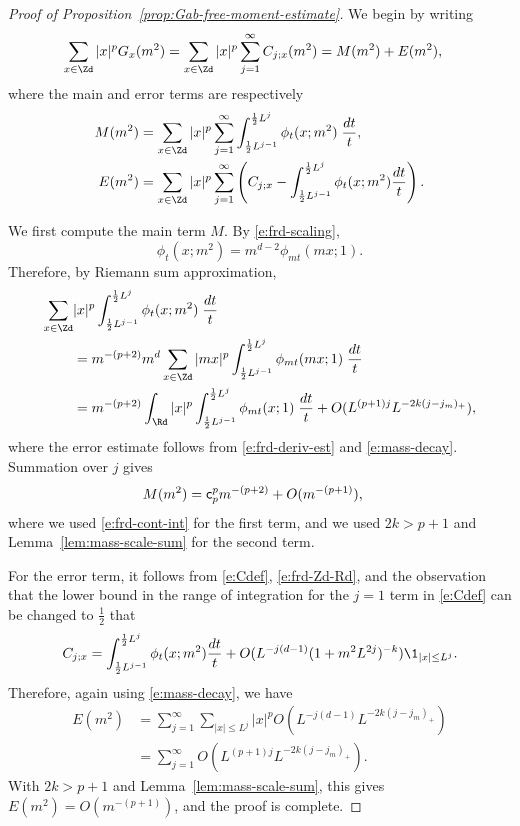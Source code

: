 \begin{proof}[Proof of Proposition~\ref{prop:Gab-free-moment-estimate}]

We begin by writing
\begin{align}
\sum_{x\in\Zd} |x|^p G_x(m^2)
    &=
    \sum_{x\in\Zd} |x|^p
    \sum_{j=1}^\infty C_{j;x}(m^2)
    =
M(m^2)
+
E(m^2)
,
\end{align}
where the main and error terms are respectively
\begin{align}
M(m^2) &=
\sum_{x\in\Zd} |x|^p \sum_{j=1}^\infty
\int_{\frac 12 L^{j-1}}^{\frac 12 L^j} \phi_t(x; m^2) \;\frac{dt}{t},
\\
E(m^2) &= \sum_{x\in\Zd} |x|^p \sum_{j=1}^\infty \left(C_{j;x} - \int_{\frac{1}{2} L^{j-1}}^{\frac{1}{2} L^j} \phi_t(x; m^2) \frac{dt}{t}\right).
\end{align}

We first compute the main term $M$. By \eqref{e:frd-scaling},
\begin{equation}
\phi_t(x; m^2) = m^{d-2} \phi_{mt}(mx; 1).
\end{equation}
Therefore, by Riemann sum approximation,
\begin{align}
\sum_{x\in\Zd} &|x|^p \int_{\frac{1}{2} L^{j-1}}^{\frac{1}{2} L^j} \phi_t(x; m^2) \; \frac{dt}{t} \\
  &= m^{-(p+2)} m^d \sum_{x\in\Zd} |mx|^p \int_{\frac{1}{2} L^{j-1}}^{\frac{1}{2} L^j} \phi_{mt}(mx; 1) \; \frac{dt}{t}
  \\ \nonumber
  &= m^{-(p + 2)} \int_\Rd |x|^p \int_{\frac{1}{2} L^{j-1}}^{\frac{1}{2} L^j} \phi_{mt}(x; 1) \; \frac{dt}{t}
    + O(L^{(p + 1) j}
    L^{-2k(j-j_m)_+})
    ,
\end{align}
where the error estimate follows from \eqref{e:frd-deriv-est} and \eqref{e:mass-decay}.
Summation over $j$ gives
\begin{align}
M(m^2)
&= {\sf c}_p^p m^{-(p + 2)} + O(m^{-(p + 1)}),
\end{align}
where we used
\eqref{e:frd-cont-int} for the first term, and we used $2k>p+1$ and
Lemma~\ref{lem:mass-scale-sum} for the second term.

For the error term,
it follows from
\eqref{e:Cdef}, \eqref{e:frd-Zd-Rd},
and the observation that the lower bound in the range of integration for the $j=1$ term in \eqref{e:Cdef}
can be changed to $\frac12$ that
\begin{equation}
\label{e:frd-integral-approx}
C_{j;x}
=
\int_{\frac{1}{2} L^{j-1}}^{\frac{1}{2} L^j} \phi_t(x; m^2) \frac{dt}{t}
+
O(L^{-j (d - 1)} (1 + m^2 L^{2j})^{-k})
\1_{|x|\leq L^j}.
\end{equation}
Therefore, again using \eqref{e:mass-decay}, we have
\begin{align}
E(m^2)
&= \sum_{j=1}^\infty \sum_{|x|\leq L^j} |x|^p O(L^{-j (d - 1)}
L^{-2k(j-j_m)_+})
\\
&= \sum_{j=1}^\infty O(L^{(p+1)j}L^{-2k(j-j_m)_+})
\label{e:free-error-estimate}
.
\end{align}
With $2k>p+1$ and Lemma~\ref{lem:mass-scale-sum}, this gives
$E(m^2) = O(m^{-(p+1)})$,
and the proof is complete.
\end{proof}